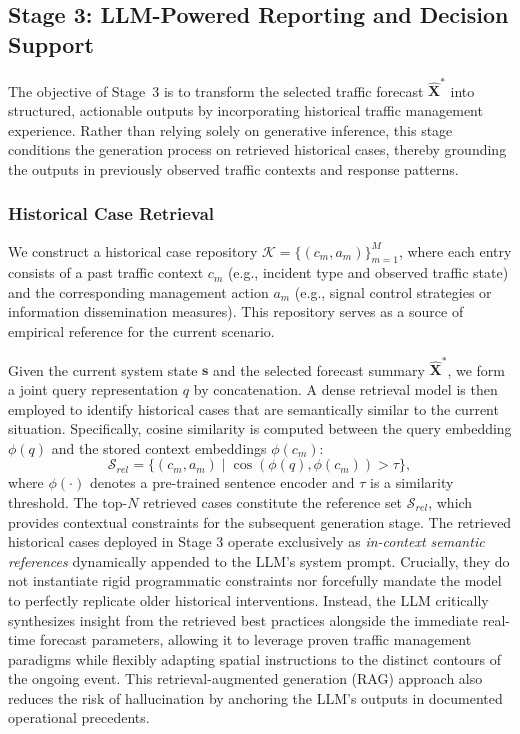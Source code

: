 \documentclass{article}
\begin{document}
\subsection{Stage 3: LLM-Powered Reporting and Decision Support}

The objective of Stage~3 is to transform the selected traffic forecast $\hat{\mathbf{X}}^*$ into structured, actionable outputs by incorporating historical traffic management experience. Rather than relying solely on generative inference, this stage conditions the generation process on retrieved historical cases, thereby grounding the outputs in previously observed traffic contexts and response patterns.

\subsubsection{Historical Case Retrieval}

We construct a historical case repository $\mathcal{K} = \{(c_m, a_m)\}_{m=1}^M$, where each entry consists of a past traffic context $c_m$ (e.g., incident type and observed traffic state) and the corresponding management action $a_m$ (e.g., signal control strategies or information dissemination measures). This repository serves as a source of empirical reference for the current scenario.

Given the current system state $\mathbf{s}$ and the selected forecast summary $\hat{\mathbf{X}}^*$, we form a joint query representation $q$ by concatenation. A dense retrieval model is then employed to identify historical cases that are semantically similar to the current situation. Specifically, cosine similarity is computed between the query embedding $\phi(q)$ and the stored context embeddings $\phi(c_m)$:
\begin{equation}
    \mathcal{S}_{rel} = \{ (c_m, a_m) \mid \cos(\phi(q), \phi(c_m)) > \tau \},
\end{equation}
where $\phi(\cdot)$ denotes a pre-trained sentence encoder and $\tau$ is a similarity threshold. The top-$N$ retrieved cases constitute the reference set $\mathcal{S}_{rel}$, which provides contextual constraints for the subsequent generation stage. The retrieved historical cases deployed in Stage 3 operate exclusively as \textit{in-context semantic references} dynamically appended to the LLM's system prompt. Crucially, they do not instantiate rigid programmatic constraints nor forcefully mandate the model to perfectly replicate older historical interventions. Instead, the LLM critically synthesizes insight from the retrieved best practices alongside the immediate real-time forecast parameters, allowing it to leverage proven traffic management paradigms while flexibly adapting spatial instructions to the distinct contours of the ongoing event. This retrieval-augmented generation (RAG) approach also reduces the risk of hallucination by anchoring the LLM's outputs in documented operational precedents.
\end{document}
